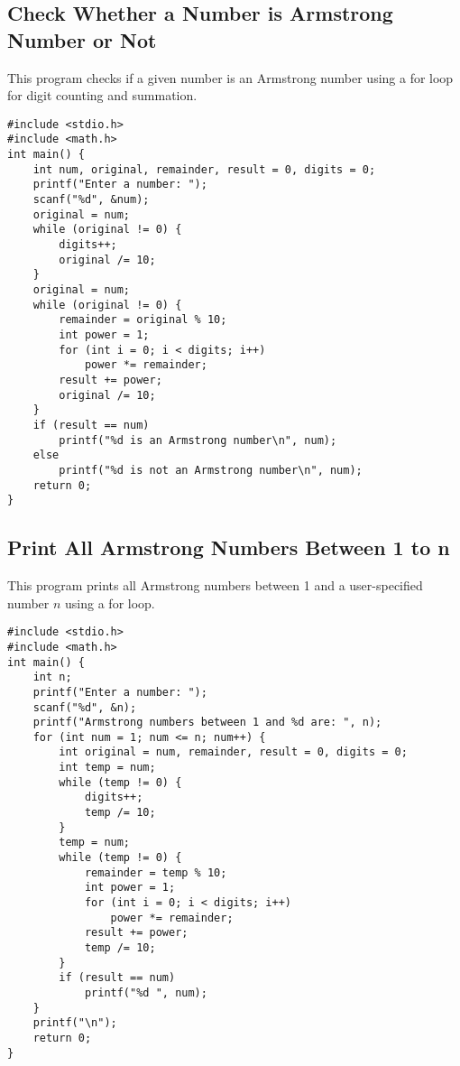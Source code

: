 \documentclass[a4paper,12pt]{article}
\begin{document}
\newpage

\subsection{Check Whether a Number is Armstrong Number or Not}
This program checks if a given number is an Armstrong number using a for loop for digit counting and summation.

\begin{lstlisting}[caption={Check Whether a Number is Armstrong Number or Not}]
#include <stdio.h>
#include <math.h>
int main() {
    int num, original, remainder, result = 0, digits = 0;
    printf("Enter a number: ");
    scanf("%d", &num);
    original = num;
    while (original != 0) {
        digits++;
        original /= 10;
    }
    original = num;
    while (original != 0) {
        remainder = original % 10;
        int power = 1;
        for (int i = 0; i < digits; i++)
            power *= remainder;
        result += power;
        original /= 10;
    }
    if (result == num)
        printf("%d is an Armstrong number\n", num);
    else
        printf("%d is not an Armstrong number\n", num);
    return 0;
}
\end{lstlisting}

\newpage

\subsection{Print All Armstrong Numbers Between 1 to n}
This program prints all Armstrong numbers between 1 and a user-specified number \(n\) using a for loop.

\begin{lstlisting}[caption={Print All Armstrong Numbers Between 1 to n}]
#include <stdio.h>
#include <math.h>
int main() {
    int n;
    printf("Enter a number: ");
    scanf("%d", &n);
    printf("Armstrong numbers between 1 and %d are: ", n);
    for (int num = 1; num <= n; num++) {
        int original = num, remainder, result = 0, digits = 0;
        int temp = num;
        while (temp != 0) {
            digits++;
            temp /= 10;
        }
        temp = num;
        while (temp != 0) {
            remainder = temp % 10;
            int power = 1;
            for (int i = 0; i < digits; i++)
                power *= remainder;
            result += power;
            temp /= 10;
        }
        if (result == num)
            printf("%d ", num);
    }
    printf("\n");
    return 0;
}
\end{lstlisting}
\end{document}
